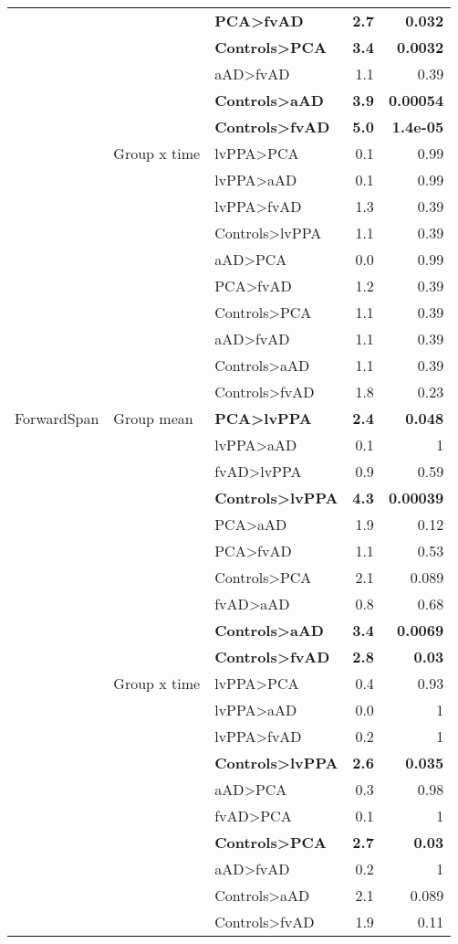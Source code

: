 \documentclass[]{article}
\begin{document}
\begin{table}[ht]
{\begin{tabular}{lllrr}
   &  & \textbf{PCA>fvAD} & \textbf{2.7} & \textbf{0.032} \\ 
   &  & \textbf{Controls>PCA} & \textbf{3.4} & \textbf{0.0032} \\ 
   &  & aAD>fvAD & 1.1 & 0.39 \\ 
   &  & \textbf{Controls>aAD} & \textbf{3.9} & \textbf{0.00054} \\ 
   &  & \textbf{Controls>fvAD} & \textbf{5.0} & \textbf{1.4e-05} \\ 
   & Group x time & lvPPA>PCA & 0.1 & 0.99 \\ 
   &  & lvPPA>aAD & 0.1 & 0.99 \\ 
   &  & lvPPA>fvAD & 1.3 & 0.39 \\ 
   &  & Controls>lvPPA & 1.1 & 0.39 \\ 
   &  & aAD>PCA & 0.0 & 0.99 \\ 
   &  & PCA>fvAD & 1.2 & 0.39 \\ 
   &  & Controls>PCA & 1.1 & 0.39 \\ 
   &  & aAD>fvAD & 1.1 & 0.39 \\ 
   &  & Controls>aAD & 1.1 & 0.39 \\ 
   &  & Controls>fvAD & 1.8 & 0.23 \\ 
  ForwardSpan & Group mean & \textbf{PCA>lvPPA} & \textbf{2.4} & \textbf{0.048} \\ 
   &  & lvPPA>aAD & 0.1 & 1 \\ 
   &  & fvAD>lvPPA & 0.9 & 0.59 \\ 
   &  & \textbf{Controls>lvPPA} & \textbf{4.3} & \textbf{0.00039} \\ 
   &  & PCA>aAD & 1.9 & 0.12 \\ 
   &  & PCA>fvAD & 1.1 & 0.53 \\ 
   &  & Controls>PCA & 2.1 & 0.089 \\ 
   &  & fvAD>aAD & 0.8 & 0.68 \\ 
   &  & \textbf{Controls>aAD} & \textbf{3.4} & \textbf{0.0069} \\ 
   &  & \textbf{Controls>fvAD} & \textbf{2.8} & \textbf{0.03} \\ 
   & Group x time & lvPPA>PCA & 0.4 & 0.93 \\ 
   &  & lvPPA>aAD & 0.0 & 1 \\ 
   &  & lvPPA>fvAD & 0.2 & 1 \\ 
   &  & \textbf{Controls>lvPPA} & \textbf{2.6} & \textbf{0.035} \\ 
   &  & aAD>PCA & 0.3 & 0.98 \\ 
   &  & fvAD>PCA & 0.1 & 1 \\ 
   &  & \textbf{Controls>PCA} & \textbf{2.7} & \textbf{0.03} \\ 
   &  & aAD>fvAD & 0.2 & 1 \\ 
   &  & Controls>aAD & 2.1 & 0.089 \\ 
   &  & Controls>fvAD & 1.9 & 0.11 \\ 
   \hline
\end{tabular}
}
\end{table}
\end{document}
